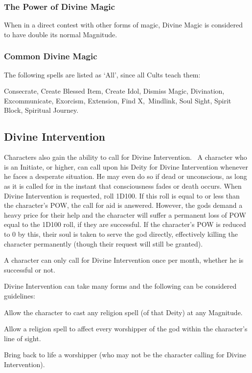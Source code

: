 \subsubsection{The Power of Divine Magic}
When in a direct contest with other forms of magic, Divine Magic is considered to have double its normal Magnitude.

\subsubsection{Common Divine Magic}
The following spells are listed as ‘All’, since all Cults teach them:

Consecrate, Create Blessed Item, Create Idol, Dismiss Magic, Divination, Excommunicate, Exorcism, Extension, Find X, Mindlink, Soul Sight, Spirit Block, Spiritual Journey.

\subsection{Divine Intervention}
Characters also gain the ability to call for Divine Intervention. 
A character who is an Initiate, or higher, can call upon his Deity for Divine Intervention whenever he faces a desperate situation. He may even do so if dead or unconscious, as long as it is called for in the instant that consciousness fades or death occurs. When Divine Intervention is requested, roll 1D100. If this roll is equal to or less than the character’s POW, the call for aid is answered. However, the gods demand a heavy price for their help and the character will suffer a permanent loss of POW equal to the 1D100 roll, if they are successful. If the character’s POW is reduced to 0 by this, their soul is taken to serve the god directly, effectively killing the character permanently (though their request will still be granted). 

A character can only call for Divine Intervention once per month, whether he is successful or not. 

Divine Intervention can take many forms and the following can be considered guidelines: 
\begin{rpg-list}
	\item Allow the character to cast any religion spell (of that Deity) at any Magnitude.
	\item Allow a religion spell to affect every worshipper of the god within the character’s line of sight. 
	\item Bring back to life a worshipper (who may not be the character calling for Divine Intervention). 
\end{rpg-list}

